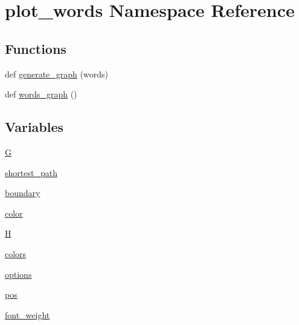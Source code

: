 \hypertarget{namespaceplot__words}{}\section{plot\+\_\+words Namespace Reference}
\label{namespaceplot__words}
\subsection*{Functions}
\begin{DoxyCompactItemize}
\item 
def \hyperlink{namespaceplot__words_a0b9e0f0b837a0442bb974deab3221fd1}{generate\+\_\+graph} (words)
\item 
def \hyperlink{namespaceplot__words_a521140919bcb56aa6bcdfe70f9261e7f}{words\+\_\+graph} ()
\end{DoxyCompactItemize}
\subsection*{Variables}
\begin{DoxyCompactItemize}
\item 
\hyperlink{namespaceplot__words_af709c6fbaa07728de4da95e1cc692564}{G}
\item 
\hyperlink{namespaceplot__words_a0ef5999fbbf086a230560cc824789d35}{shortest\+\_\+path}
\item 
\hyperlink{namespaceplot__words_a364b1001de5e1e6e15bb5569f788e34f}{boundary}
\item 
\hyperlink{namespaceplot__words_a768e53780ce6d6ec9b529686bfe29409}{color}
\item 
\hyperlink{namespaceplot__words_a5a8b9858573284c30766ea7bc07d0796}{H}
\item 
\hyperlink{namespaceplot__words_a15b918ecc072ac957d28dd184fbe4be3}{colors}
\item 
\hyperlink{namespaceplot__words_a112b9009d154c306ad9f4ab3f85412f3}{options}
\item 
\hyperlink{namespaceplot__words_a72ecf16acb376766ed3dd9d64acf4255}{pos}
\item 
\hyperlink{namespaceplot__words_a065c33a61adaca5ad0ed2f0763107a9b}{font\+\_\+weight}
\end{DoxyCompactItemize}


